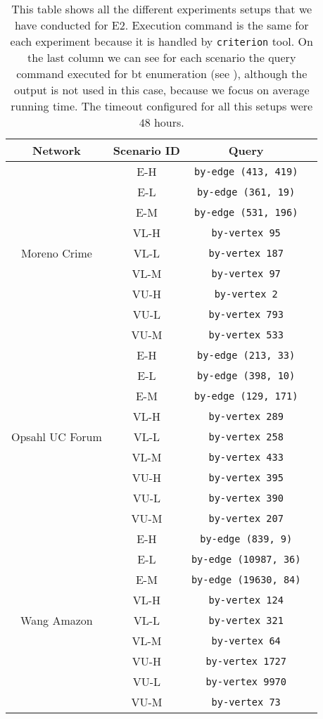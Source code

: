 \begin{table}[htp!]
\centering
\begin{tabular}{|c|c|c|c|}
  \hline
  \textbf{Network} & \textbf{Scenario ID} & \textbf{Query}\\
  \hline
  \multirow{9}{*}{Moreno Crime} & E-H & \texttt{by-edge (413, 419)}\\
  & E-L & \texttt{by-edge (361, 19)}\\
  & E-M & \texttt{by-edge (531, 196)}\\
  & VL-H & \texttt{by-vertex 95}\\
  & VL-L & \texttt{by-vertex 187}\\
  & VL-M & \texttt{by-vertex 97}\\
  & VU-H & \texttt{by-vertex 2}\\
  & VU-L & \texttt{by-vertex 793}\\
  & VU-M & \texttt{by-vertex 533}\\
  \hline
  \multirow{9}{*}{Opsahl UC Forum} & E-H & \texttt{by-edge (213, 33)}\\
  & E-L & \texttt{by-edge (398, 10)}\\
  & E-M & \texttt{by-edge (129, 171)}\\
  & VL-H & \texttt{by-vertex 289}\\
  & VL-L & \texttt{by-vertex 258}\\
  & VL-M & \texttt{by-vertex 433}\\
  & VU-H & \texttt{by-vertex 395}\\
  & VU-L & \texttt{by-vertex 390}\\
  & VU-M & \texttt{by-vertex 207}\\
  \hline
  \multirow{9}{*}{Wang Amazon} & E-H & \texttt{by-edge (839, 9)}\\
  & E-L & \texttt{by-edge (10987, 36)}\\
  & E-M & \texttt{by-edge (19630, 84)}\\
  & VL-H & \texttt{by-vertex 124}\\
  & VL-L & \texttt{by-vertex 321}\\
  & VL-M & \texttt{by-vertex 64}\\
  & VU-H & \texttt{by-vertex 1727}\\
  & VU-L & \texttt{by-vertex 9970}\\
  & VU-M & \texttt{by-vertex 73}\\
  \hline
\end{tabular}
\caption[{[EE] E2 Procedure}]{This table shows all the different experiments setups that we have conducted for E2. Execution command is the same for each experiment because it is handled by \texttt{criterion} tool. On the last column we can see for each scenario the query command executed for \acrshort{bt} enumeration (see ), although the output is not used in this case, because we focus on average running time. The timeout configured for all this setups were $48$ hours.}
\label{table:e2:def}
\end{table}

